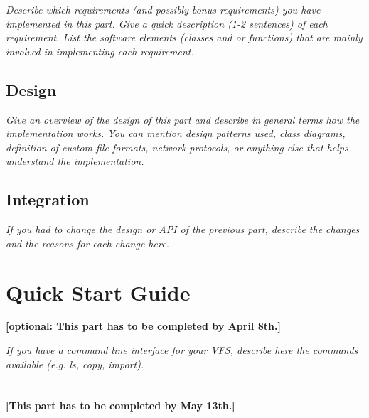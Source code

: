 \documentclass[a4paper,12pt]{article}
\begin{document}
\emph{Describe which requirements (and possibly bonus requirements) you have implemented in this part. Give a quick description (1-2 sentences) of each requirement. List the software elements (classes and or functions) that are mainly involved in implementing each requirement.}


\subsection{Design}

\emph{Give an overview of the design of this part and describe in general terms how the implementation works. You can mention design patterns used, class diagrams, definition of custom file formats, network protocols, or anything else that helps understand the implementation.}


\subsection{Integration}

\emph{If you had to change the design or API of the previous part, describe the changes and the reasons for each change here.}




\section{Quick Start Guide}

\textbf{[optional: This part has to be completed by April 8th.]}

\emph{If you have a command line interface for your VFS, describe here the commands available (e.g. ls, copy, import).} \\ \\ \\


\noindent\textbf{[This part has to be completed by May 13th.]}
\end{document}
